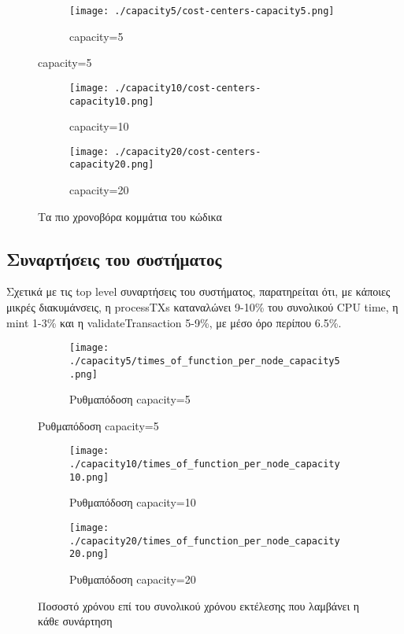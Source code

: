 \documentclass{article}
\newcommand{\eng}[1]{\foreignlanguage{english}{#1}} %
\begin{document}
\graphicspath{{../experiments/profiled\_outputs/docker/throughput/}}

\begin{figure}[ht]
    \centering
    \begin{subfigure}{\textwidth}
        \texttt{[image: ./capacity5/cost-centers-capacity5.png]}
        \caption{\eng{capacity=5}}
    \end{subfigure}
\end{figure}
\begin{figure}[ht]
    \ContinuedFloat
    \begin{subfigure}{\textwidth}
        \texttt{[image: ./capacity10/cost-centers-capacity10.png]}
        \caption{\eng{capacity=10}}
    \end{subfigure}
    \begin{subfigure}{\textwidth}
        \texttt{[image: ./capacity20/cost-centers-capacity20.png]}
        \caption{\eng{capacity=20}}
    \end{subfigure}
    \caption{Τα πιο χρονοβόρα κομμάτια του κώδικα}
    \label{fig:throughput-cost-centers}
\end{figure}
\FloatBarrier

\subsection{Συναρτήσεις του συστήματος}

Σχετικά με τις \eng{top level} συναρτήσεις του συστήματος, παρατηρείται ότι, με
κάποιες μικρές διακυμάνσεις, η \eng{processTXs} καταναλώνει 9-10\% του
συνολικού \eng{CPU time}, η \eng{mint} 1-3\% και η \eng{validateTransaction}
5-9\%, με μέσο όρο περίπου 6.5\%. 

\begin{figure}[ht]
    \centering
    \begin{subfigure}{\textwidth}
        \texttt{[image: ./capacity5/times\_of\_function\_per\_node\_capacity5.png]}
        \caption{Ρυθμαπόδοση \eng{capacity=5}}
    \end{subfigure}
\end{figure}
\begin{figure}[ht]
    \ContinuedFloat
    \begin{subfigure}{\textwidth}
        \texttt{[image: ./capacity10/times\_of\_function\_per\_node\_capacity10.png]}
        \caption{Ρυθμαπόδοση \eng{capacity=10}}
    \end{subfigure}
    \begin{subfigure}{\textwidth}
        \texttt{[image: ./capacity20/times\_of\_function\_per\_node\_capacity20.png]}
        \caption{Ρυθμαπόδοση \eng{capacity=20}}
    \end{subfigure}
    \caption{Ποσοστό χρόνου επί του συνολικού χρόνου εκτέλεσης που λαμβάνει η κάθε συνάρτηση}
\end{figure}
\FloatBarrier
\end{document}

